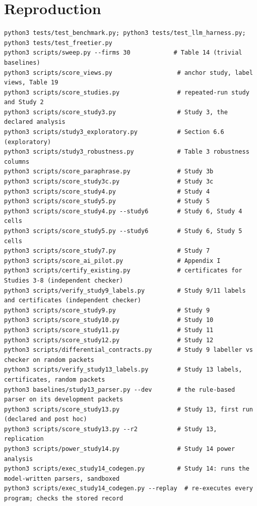 \documentclass[10pt,twocolumn]{article}
\begin{document}
\section{Reproduction}\label{app:A}
\begin{Verbatim}[breaklines,breakanywhere,fontsize=\scriptsize,frame=single,framerule=0.3pt,rulecolor=\color{fggray}]
python3 tests/test_benchmark.py; python3 tests/test_llm_harness.py; python3 tests/test_freetier.py
python3 scripts/sweep.py --firms 30            # Table 14 (trivial baselines)
python3 scripts/score_views.py                  # anchor study, label views, Table 19
python3 scripts/score_studies.py                # repeated-run study and Study 2
python3 scripts/score_study3.py                 # Study 3, the declared analysis
python3 scripts/study3_exploratory.py           # Section 6.6 (exploratory)
python3 scripts/study3_robustness.py            # Table 3 robustness columns
python3 scripts/score_paraphrase.py             # Study 3b
python3 scripts/score_study3c.py                # Study 3c
python3 scripts/score_study4.py                 # Study 4
python3 scripts/score_study5.py                 # Study 5
python3 scripts/score_study4.py --study6        # Study 6, Study 4 cells
python3 scripts/score_study5.py --study6        # Study 6, Study 5 cells
python3 scripts/score_study7.py                 # Study 7
python3 scripts/score_ai_pilot.py               # Appendix I
python3 scripts/certify_existing.py             # certificates for Studies 3-8 (independent checker)
python3 scripts/verify_study9_labels.py         # Study 9/11 labels and certificates (independent checker)
python3 scripts/score_study9.py                 # Study 9
python3 scripts/score_study10.py                # Study 10
python3 scripts/score_study11.py                # Study 11
python3 scripts/score_study12.py                # Study 12
python3 scripts/differential_contracts.py       # Study 9 labeller vs checker on random packets
python3 scripts/verify_study13_labels.py        # Study 13 labels, certificates, random packets
python3 baselines/study13_parser.py --dev       # the rule-based parser on its development packets
python3 scripts/score_study13.py                # Study 13, first run (declared and post hoc)
python3 scripts/score_study13.py --r2           # Study 13, replication
python3 scripts/power_study14.py                # Study 14 power analysis
python3 scripts/exec_study14_codegen.py         # Study 14: runs the model-written parsers, sandboxed
python3 scripts/exec_study14_codegen.py --replay  # re-executes every program; checks the stored record

\end{Verbatim}
\end{document}
